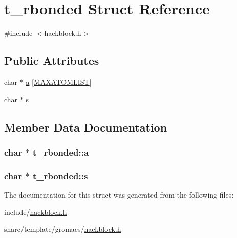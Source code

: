 \hypertarget{structt__rbonded}{\section{t\-\_\-rbonded \-Struct \-Reference}
\label{structt__rbonded}
}


{\ttfamily \#include $<$hackblock.\-h$>$}

\subsection*{\-Public \-Attributes}
\begin{DoxyCompactItemize}
\item 
char $\ast$ \hyperlink{structt__rbonded_a9e307ea355001a9c94ffee8e908df6c7}{a} \mbox{[}\hyperlink{share_2template_2gromacs_2types_2idef_8h_aaccd7b6c82931775c7108582e75c3e6e}{\-M\-A\-X\-A\-T\-O\-M\-L\-I\-S\-T}\mbox{]}
\item 
char $\ast$ \hyperlink{structt__rbonded_ae7fded976c3176e3cfed8ccce9609420}{s}
\end{DoxyCompactItemize}


\subsection{\-Member \-Data \-Documentation}
\hypertarget{structt__rbonded_a9e307ea355001a9c94ffee8e908df6c7}{
\subsubsection[{a}]{\setlength{\rightskip}{0pt plus 5cm}char $\ast$ {\bf t\-\_\-rbonded\-::a}}}\label{structt__rbonded_a9e307ea355001a9c94ffee8e908df6c7}
\hypertarget{structt__rbonded_ae7fded976c3176e3cfed8ccce9609420}{
\subsubsection[{s}]{\setlength{\rightskip}{0pt plus 5cm}char $\ast$ {\bf t\-\_\-rbonded\-::s}}}\label{structt__rbonded_ae7fded976c3176e3cfed8ccce9609420}


\-The documentation for this struct was generated from the following files\-:\begin{DoxyCompactItemize}
\item 
include/\hyperlink{include_2hackblock_8h}{hackblock.\-h}\item 
share/template/gromacs/\hyperlink{share_2template_2gromacs_2hackblock_8h}{hackblock.\-h}\end{DoxyCompactItemize}
